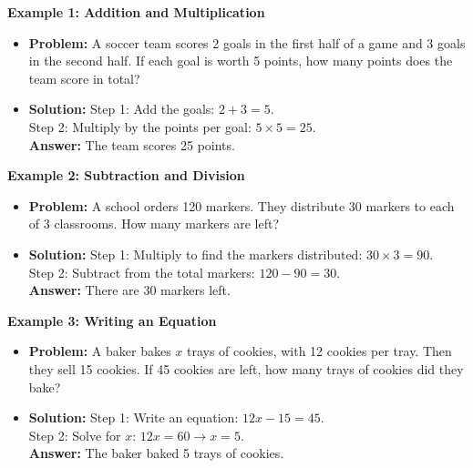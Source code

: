 \documentclass[12pt]{article}
\begin{document}
\begin{tcolorbox}[colframe=black!60, colback=white, 
coltitle=black, colbacktitle=black!15, fonttitle=\bfseries\Large, 
title=Examples, halign title=center, left=10pt, right=10pt, top=10pt, bottom=15pt]
\textbf{Example 1: Addition and Multiplication}
\begin{itemize}
    \item \textbf{Problem:} A soccer team scores 2 goals in the first half of a game and 3 goals in the second half. If each goal is worth 5 points, how many points does the team score in total?
    \item \textbf{Solution:} Step 1: Add the goals: \(2 + 3 = 5\).\\
    Step 2: Multiply by the points per goal: \(5 \times 5 = 25\).\\
    \textbf{Answer:} The team scores 25 points.
\end{itemize}

\textbf{Example 2: Subtraction and Division}
\begin{itemize}
    \item \textbf{Problem:} A school orders 120 markers. They distribute 30 markers to each of 3 classrooms. How many markers are left?
    \item \textbf{Solution:} Step 1: Multiply to find the markers distributed: \(30 \times 3 = 90\).\\
    Step 2: Subtract from the total markers: \(120 - 90 = 30\).\\
    \textbf{Answer:} There are 30 markers left.
\end{itemize}

\textbf{Example 3: Writing an Equation}
\begin{itemize}
    \item \textbf{Problem:} A baker bakes \(x\) trays of cookies, with 12 cookies per tray. Then they sell 15 cookies. If 45 cookies are left, how many trays of cookies did they bake?
    \item \textbf{Solution:} Step 1: Write an equation: \(12x - 15 = 45\).\\
    Step 2: Solve for \(x\): \(12x = 60 \rightarrow x = 5\).\\
    \textbf{Answer:} The baker baked 5 trays of cookies.
\end{itemize}
\end{tcolorbox}

\vspace{1em}
\end{document}
